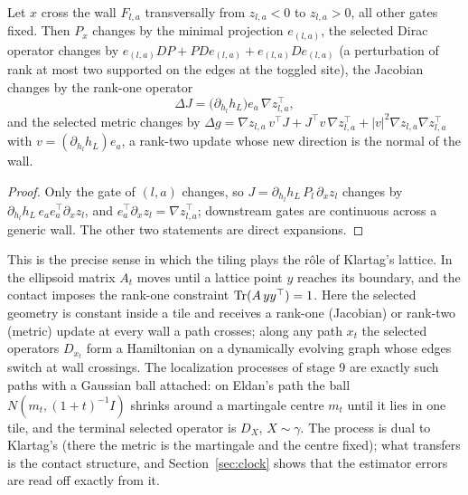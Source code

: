 \begin{proposition}\label{prop:contact}
Let $x$ cross the wall $F_{l,a}$ transversally from $z_{l,a}<0$ to $z_{l,a}>0$, all other gates fixed. Then $P_x$
changes by the minimal projection $e_{(l,a)}$, the selected Dirac operator changes by
$e_{(l,a)}DP+PDe_{(l,a)}+e_{(l,a)}De_{(l,a)}$ (a perturbation of rank at most two supported on the edges at the toggled
site), the Jacobian changes by the rank-one operator
\[
\Delta J=\big(\partial_{h_l}h_L\big)e_a\,\nabla z_{l,a}^{\top},
\]
and the selected metric changes by $\Delta g=\nabla z_{l,a}\,v^{\top}J+J^{\top}v\,\nabla z_{l,a}^{\top}+|v|^2\nabla z_{l,a}
\nabla z_{l,a}^{\top}$ with $v=(\partial_{h_l}h_L)e_a$, a rank-two update whose new direction is the normal of the wall.
\end{proposition}
\begin{proof}
Only the gate of $(l,a)$ changes, so $J=\partial_{h_l}h_L\,P_l\,\partial_xz_l$ changes by $\partial_{h_l}h_L\,e_ae_a^{\top}
\partial_xz_l$, and $e_a^{\top}\partial_xz_l=\nabla z_{l,a}^{\top}$; downstream gates are continuous across a generic
wall. The other two statements are direct expansions.
\end{proof}

This is the precise sense in which the tiling plays the r\^ole of Klartag's lattice. In \cite{klartag} the ellipsoid
matrix $A_t$ moves until a lattice point $y$ reaches its boundary, and the contact imposes the rank-one constraint
$\operatorname{Tr}(A\,yy^{\top})=1$. Here the selected geometry is constant inside a tile and receives a rank-one (Jacobian) or
rank-two (metric) update at every wall a path crosses; along any path $x_t$ the selected operators $D_{x_t}$ form a
Hamiltonian on a dynamically evolving graph whose edges switch at wall crossings. The localization processes of stage
9 are exactly such paths with a Gaussian ball attached: on Eldan's path the ball $N(m_t,(1+t)^{-1}I)$ shrinks around a
martingale centre $m_t$ until it lies in one tile, and the terminal selected operator is $D_X$, $X\sim\gamma$. The
process is dual to Klartag's (there the metric is the martingale and the centre fixed); what transfers is the contact
structure, and Section~\ref{sec:clock} shows that the estimator errors are read off exactly from it.

